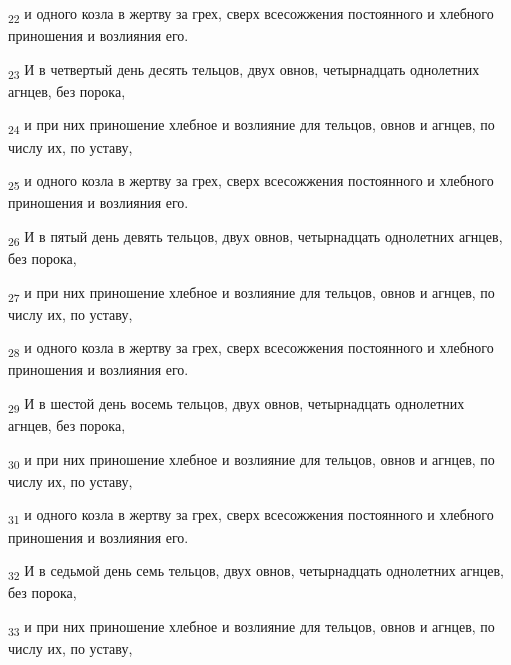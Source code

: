 \begin{tcolorbox}
\textsubscript{22} и одного козла в жертву за грех, сверх всесожжения постоянного и хлебного приношения и возлияния его.
\end{tcolorbox}
\begin{tcolorbox}
\textsubscript{23} И в четвертый день десять тельцов, двух овнов, четырнадцать однолетних агнцев, без порока,
\end{tcolorbox}
\begin{tcolorbox}
\textsubscript{24} и при них приношение хлебное и возлияние для тельцов, овнов и агнцев, по числу их, по уставу,
\end{tcolorbox}
\begin{tcolorbox}
\textsubscript{25} и одного козла в жертву за грех, сверх всесожжения постоянного и хлебного приношения и возлияния его.
\end{tcolorbox}
\begin{tcolorbox}
\textsubscript{26} И в пятый день девять тельцов, двух овнов, четырнадцать однолетних агнцев, без порока,
\end{tcolorbox}
\begin{tcolorbox}
\textsubscript{27} и при них приношение хлебное и возлияние для тельцов, овнов и агнцев, по числу их, по уставу,
\end{tcolorbox}
\begin{tcolorbox}
\textsubscript{28} и одного козла в жертву за грех, сверх всесожжения постоянного и хлебного приношения и возлияния его.
\end{tcolorbox}
\begin{tcolorbox}
\textsubscript{29} И в шестой день восемь тельцов, двух овнов, четырнадцать однолетних агнцев, без порока,
\end{tcolorbox}
\begin{tcolorbox}
\textsubscript{30} и при них приношение хлебное и возлияние для тельцов, овнов и агнцев, по числу их, по уставу,
\end{tcolorbox}
\begin{tcolorbox}
\textsubscript{31} и одного козла в жертву за грех, сверх всесожжения постоянного и хлебного приношения и возлияния его.
\end{tcolorbox}
\begin{tcolorbox}
\textsubscript{32} И в седьмой день семь тельцов, двух овнов, четырнадцать однолетних агнцев, без порока,
\end{tcolorbox}
\begin{tcolorbox}
\textsubscript{33} и при них приношение хлебное и возлияние для тельцов, овнов и агнцев, по числу их, по уставу,
\end{tcolorbox}
